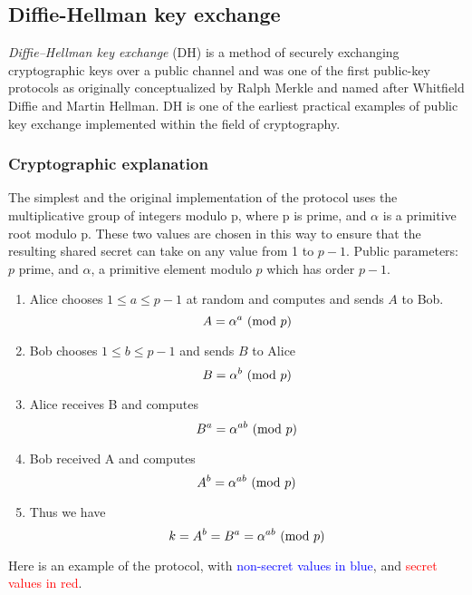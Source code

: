 \pagebreak
\subsection{Diffie-Hellman key exchange}
\textit{Diffie–Hellman key exchange} (DH) is a method of securely exchanging cryptographic keys over a public channel
and was one of the first public-key protocols as originally conceptualized
by Ralph Merkle and named after Whitfield Diffie and Martin Hellman.
DH is one of the earliest practical examples of public key exchange implemented within the field of cryptography.

\subsubsection{Cryptographic explanation}
The simplest and the original implementation of the protocol uses the multiplicative group of integers modulo p,
where p is prime, and $\alpha$ is a primitive root modulo p.
These two values are chosen in this way to ensure that the resulting shared secret can take on any value from 1 to $p - 1$.
Public parameters: $p$ prime, and $\alpha$, a primitive element modulo $p$ which has order $p − 1$.

\begin{enumerate}
    \item Alice chooses $1 \leq a \leq p − 1$ at random and computes and sends $A$ to Bob.
        $$A = \alpha^a \ (\mathrm{mod}\ p)$$
        \item Bob chooses $1 \leq b \leq p - 1$ and sends $B$ to Alice
        $$B = \alpha^b \ (\mathrm{mod}\ p)$$
        \item Alice receives B and computes
        $$B^a = \alpha^{ab} \ (\mathrm{mod}\ p)$$
        \item Bob received A and computes
        $$A^b = \alpha^{ab} \ (\mathrm{mod}\ p)$$
        \item Thus we have
            $$k = A^b = B^a = \alpha^{ab} \ (\mathrm{mod}\ p)$$
\end{enumerate}
Here is an example of the protocol, with \textcolor{blue}{non-secret values in blue},
and \textcolor{red}{secret values in red}.

